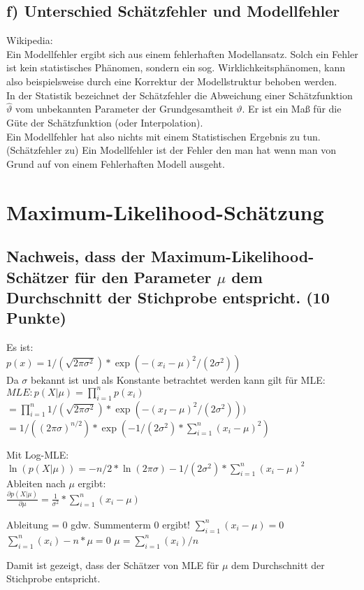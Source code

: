\documentclass{scrartcl}
\begin{document}
\subsection*{f) Unterschied Schätzfehler und Modellfehler}
Wikipedia: \\
Ein Modellfehler ergibt sich aus einem fehlerhaften Modellansatz. Solch ein Fehler ist kein statistisches Phänomen, sondern ein sog. Wirklichkeitsphänomen, kann also beispielsweise durch eine Korrektur der Modellstruktur behoben werden. \\
In der Statistik bezeichnet der Schätzfehler die Abweichung einer Schätzfunktion $\hat{\vartheta}$ vom unbekannten Parameter der Grundgesamtheit $\vartheta$. Er ist ein Maß für die Güte der Schätzfunktion (oder Interpolation). \\

Ein Modellfehler hat also nichts mit einem Statistischen Ergebnis zu tun.(Schätzfehler zu) Ein Modellfehler ist der Fehler den man hat wenn man von Grund auf von einem Fehlerhaften Modell ausgeht. \\



\section{Maximum-Likelihood-Schätzung}
\subsection*{Nachweis, dass der Maximum-Likelihood-Schätzer für den Parameter $\mu$ dem Durchschnitt der Stichprobe entspricht. (10 Punkte)}
Es ist:\\
$p(x)=1/(\sqrt{2\pi \sigma^2})* \exp(-(x_i-\mu)^2/(2\sigma^2))$\\
Da $\sigma$ bekannt ist und als Konstante betrachtet werden kann gilt für MLE:\\
$MLE: p(X|\mu)=\prod_{i=1}^{n}p(x_i) $\\
$=\prod_{i=1}^{n}1/(\sqrt{2\pi \sigma^2})*\exp(-(x_I-\mu)^2/(2\sigma^2))) $\\
$= 1/((2\pi \sigma)^{n/2})* \exp(-1/(2\sigma^2)*\sum_{i=1}^{n}(x_i-\mu)^2)$

Mit Log-MLE:\\
$\ln(p(X|\mu))= -n/2*\ln(2\pi \sigma) - 1/(2\sigma^2)*\sum_{i=1}^{n}(x_i-\mu)^2$\\
Ableiten nach $\mu$ ergibt:\\
$\frac{\partial p(X|\mu)}{\partial \mu} = \frac{1}{\sigma^2}*\sum_{i=1}^{n}(x_i-\mu)$

Ableitung = 0 gdw. Summenterm 0 ergibt!
$\sum_{i=1}^{n}(x_i-\mu) = 0$\\
$\sum_{i=1}^{n}(x_i)-n*\mu = 0$
$\mu = \sum_{i=1}^{n}(x_i) / n$

Damit ist gezeigt, dass der Schätzer von MLE für $\mu$ dem Durchschnitt der Stichprobe entspricht.
 
\end{document}
